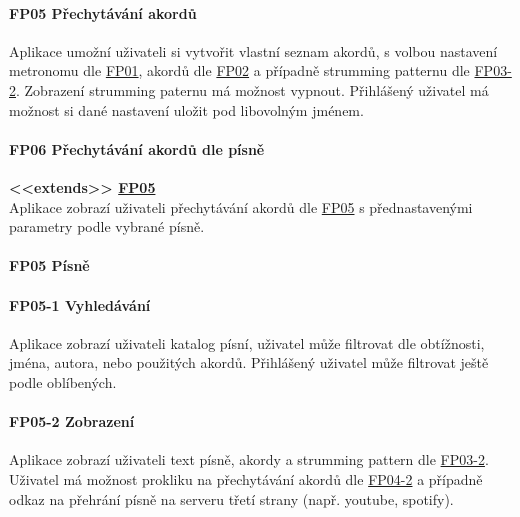 \noindent \begin{minipage}{\textwidth}
    \paragraph{FP05 Přechytávání akordů} \label{FP05}
    \begin{smallindent}{}
        Aplikace umožní uživateli si vytvořit vlastní seznam akordů, s volbou nastavení metronomu dle \hyperref[FP01]{FP01}, akordů dle \hyperref[FP02]{FP02} a případně strumming patternu dle \hyperref[FP03-2]{FP03-2}. Zobrazení strumming paternu má možnost vypnout. 
        Přihlášený uživatel má možnost si dané nastavení uložit pod libovolným jménem.
    \end{smallindent}
\end{minipage}

\noindent \begin{minipage}{\textwidth}
    \paragraph{FP06 Přechytávání akordů dle písně} \label{FP06} 
    \begin{smallindent}{}
        \textbf{<<extends>> \hyperref[FP05]{FP05}} \\
        Aplikace zobrazí uživateli přechytávání akordů dle \hyperref[FP05]{FP05} s přednastavenými parametry podle vybrané písně.
    \end{smallindent}
\end{minipage}

\noindent \begin{minipage}{\textwidth}
    \paragraph{FP05 Písně}
    \noindent \paragraph{FP05-1 Vyhledávání} \label{FP05-1}
    \begin{smallindent}{}
        Aplikace zobrazí uživateli katalog písní, uživatel může filtrovat dle obtížnosti, jména, autora, nebo použitých akordů.
        Přihlášený uživatel může filtrovat ještě podle oblíbených.
    \end{smallindent}
\end{minipage}

\noindent \begin{minipage}{\textwidth}
    \paragraph{FP05-2 Zobrazení} \label{FP05-2}
    \begin{smallindent}{}
        Aplikace zobrazí uživateli text písně, akordy a strumming pattern dle \hyperref[FP03-2]{FP03-2}. Uživatel má možnost prokliku na přechytávání akordů dle \hyperref[FP04-2]{FP04-2} a případně odkaz na přehrání písně na serveru třetí strany (např. youtube, spotify).
    \end{smallindent}
\end{minipage}

